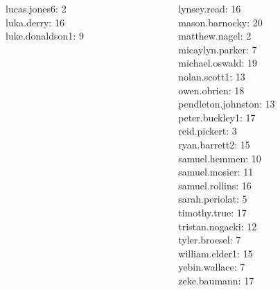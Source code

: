 \documentclass[10pt]{beamer}
\begin{document}
\begin{frame}
\begin{columns}
\begin{column}{0.33\textwidth}
lucas.jones6: 2 \\ 
luka.derry: 16 \\ 
luke.donaldson1: 9 \\\end{column}
\begin{column}{0.33\textwidth}
lynsey.read: 16 \\ 
mason.barnocky: 20 \\ 
matthew.nagel: 2 \\ 
micaylyn.parker: 7 \\ 
michael.oswald: 19 \\ 
nolan.scott1: 13 \\ 
owen.obrien: 18 \\ 
pendleton.johnston: 13 \\ 
peter.buckley1: 17 \\ 
reid.pickert: 3 \\ 
ryan.barrett2: 15 \\ 
samuel.hemmen: 10 \\ 
samuel.mosier: 11 \\ 
samuel.rollins: 16 \\ 
sarah.periolat: 5 \\ 
timothy.true: 17 \\ 
tristan.nogacki: 12 \\ 
tyler.broesel: 7 \\ 
william.elder1: 15 \\ 
yebin.wallace: 7 \\ 
zeke.baumann: 17 \\\end{column}
\end{columns}
\vfill
\end{frame}
\end{document}
